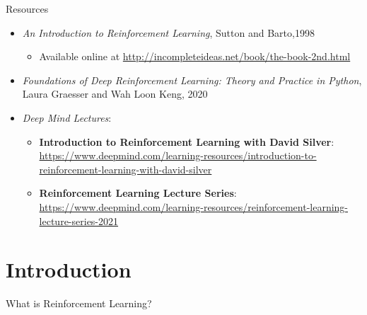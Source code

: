 \documentclass[presentation, 9pt]{beamer}\mode<presentation>{\usetheme{AMSBolognaFC}}
\begin{document}
\begin{frame}{Resources}
\begin{itemize}
	\item \emph{An Introduction to Reinforcement Learning}, Sutton and Barto,1998
	\begin{itemize}
		\item Available online at \url{http://incompleteideas.net/book/the-book-2nd.html}
	\end{itemize}
	\item \emph{Foundations of Deep Reinforcement Learning: Theory and Practice in Python}, Laura Graesser and Wah Loon Keng, 2020
	\item \emph{Deep Mind Lectures}:
	\begin{itemize}
		\item \textbf{Introduction to Reinforcement Learning with David Silver}: \url{https://www.deepmind.com/learning-resources/introduction-to-reinforcement-learning-with-david-silver}
		\item \textbf{Reinforcement Learning Lecture Series}: \url{https://www.deepmind.com/learning-resources/reinforcement-learning-lecture-series-2021}
	\end{itemize}
\end{itemize}
\end{frame}
\section{Introduction}
\begin{frame}[plain,c]
	\begin{center}
	\Huge What is Reinforcement Learning?
	\end{center}
\end{frame}
\end{document}
